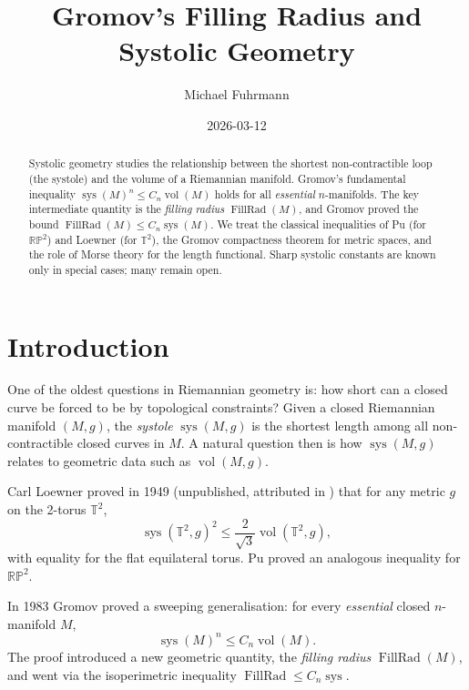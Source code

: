 \documentclass[12pt,a4paper]{amsart}
\theoremstyle{definition}
\theoremstyle{remark}
\DeclareMathOperator{\sys}{sys}
\DeclareMathOperator{\FillRad}{FillRad}
\DeclareMathOperator{\vol}{vol}
\newcommand{\RP}{\mathbb{RP}}
\newcommand{\TT}{\mathbb{T}}
\begin{document}
\begin{abstract}
Systolic geometry studies the relationship between the shortest
non-contractible loop (the systole) and the volume of a Riemannian manifold.
Gromov's fundamental inequality $\sys(M)^n \le C_n \vol(M)$ holds for all
\emph{essential} $n$-manifolds.  The key intermediate quantity is the
\emph{filling radius} $\FillRad(M)$, and Gromov proved the bound
$\FillRad(M) \le C_n \sys(M)$.  We treat the classical inequalities of
Pu (for $\RP^2$) and Loewner (for $\TT^2$), the Gromov compactness theorem
for metric spaces, and the role of Morse theory for the length functional.
Sharp systolic constants are known only in special cases; many remain open.
\end{abstract}

\title{Gromov's Filling Radius and Systolic Geometry}

\author{Michael Fuhrmann}
\address{Specialist Mathematics Project, Build 169}
\date{2026-03-12}

\maketitle
\tableofcontents

\section{Introduction}

One of the oldest questions in Riemannian geometry is: how short can a
closed curve be forced to be by topological constraints?  Given a closed
Riemannian manifold $(M,g)$, the \emph{systole} $\sys(M,g)$ is the
shortest length among all non-contractible closed curves in $M$.  A natural
question then is how $\sys(M,g)$ relates to geometric data such as
$\vol(M,g)$.

Carl Loewner proved in 1949 (unpublished, attributed in \cite{Pu1952}) that
for any metric $g$ on the 2-torus $\TT^2$,
\[
  \sys(\TT^2, g)^2 \le \frac{2}{\sqrt{3}} \vol(\TT^2, g),
\]
with equality for the flat equilateral torus.  Pu \cite{Pu1952} proved
an analogous inequality for $\RP^2$.

In 1983 Gromov \cite{Gromov1983} proved a sweeping generalisation: for
every \emph{essential} closed $n$-manifold $M$,
\[
  \sys(M)^n \le C_n \vol(M).
\]
The proof introduced a new geometric quantity, the \emph{filling radius}
$\FillRad(M)$, and went via the isoperimetric inequality $\FillRad \le C_n \sys$.
\end{document}
